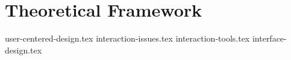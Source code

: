 \chapter{Theoretical Framework}
{user-centered-design.tex}
{interaction-issues.tex}
{interaction-tools.tex}
{interface-design.tex}
